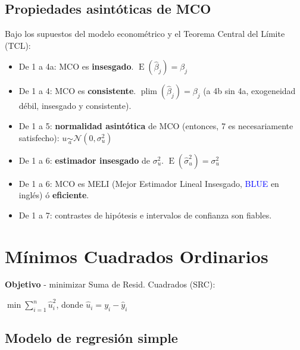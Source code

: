 \documentclass[10pt, a4paper, landscape]{article}
\DeclareMathOperator{\E}{E}
\begin{document}
\begin{multicols}{3}
\subsection*{Propiedades asintóticas de MCO}

Bajo los supuestos del modelo econométrico y el Teorema Central del Límite (TCL):

\begin{itemize}[leftmargin=*]
	\item De 1 a 4a: MCO es \textbf{insesgado}. \( \E(\hat{\beta}_j) = \beta_{j} \)
	\item De 1 a 4: MCO es \textbf{consistente}. \( \operatorname{plim}(\hat{\beta}_{j}) = \beta_{j} \) (a 4b sin 4a, exogeneidad débil, insesgado y consistente).
	\item De 1 a 5: \textbf{normalidad asintótica} de MCO (entonces, 7 es necesariamente satisfecho): \( u \underset{a}{\sim} \mathcal{N} (0, \sigma_{u}^{2}) \)
	\item De 1 a 6: \textbf{estimador insesgado} de \( \sigma_{u}^{2} \). \( \E(\hat{\sigma}_{u}^{2}) = \sigma_{u}^{2} \)
	\item De 1 a 6: MCO es MELI (Mejor Estimador Lineal Insesgado, \textcolor{blue}{BLUE} en inglés) ó \textbf{eficiente}.
	\item De 1 a 7: contrastes de hipótesis e intervalos de confianza son fiables.
\end{itemize}

\columnbreak

\section*{Mínimos Cuadrados Ordinarios}

\textbf{Objetivo} - minimizar Suma de Resid. Cuadrados (SRC):

\begin{center}
	\( \min \sum_{i = 1}^{n} \hat{u}_{i}^{2} \), donde \( \hat{u}_{i} = y_{i} - \hat{y}_{i} \)
\end{center}

\subsection*{Modelo de regresión simple}

\setlength{\multicolsep}{2pt}
\setlength{\columnsep}{-40pt}
\begin{multicols}{2}



\end{multicols}
\end{multicols}
\end{document}
